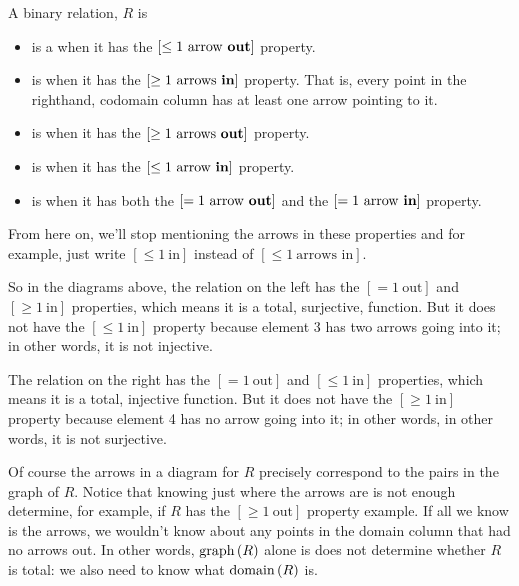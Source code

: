 \begin{definition}
A binary relation, $R$ is
\begin{itemize}

\item is a  when it has the $[\le 1\ \text{arrow
    \textbf{out}}]$ property.

\item is  when it has the $[\ge 1\ \text{arrows
    \textbf{in}}]$ property.  That is, every point in the righthand,
     codomain column has at least one arrow pointing to it.

\item is  when it has the $[\ge 1\ \text{arrows
       \textbf{out}}]$ property.

\item is  when it has the $[\le 1\ \text{arrow
    \textbf{in}}]$ property.

\item is  when it has both the $[=1\ \text{arrow
    \textbf{out}}]$ and the $[=1\ \text{arrow \textbf{in}}]$ property.
\end{itemize}
\end{definition}

From here on, we'll stop mentioning the arrows in these properties and for
example, just write $[\le 1\ \text{in}]$ instead of $[\le 1\ \text{arrows
  in}]$.

So in the diagrams above, the relation on the left has the $[=1\
\text{out}]$ and $[\ge 1\ \text{in}]$ properties, which means it is a
total, surjective, function.  But it does not have the $[\le 1\
\text{in}]$ property because element 3 has two arrows going into it; in
other words, it is not injective.

The relation on the right has the $[=1\ \text{out}]$ and $[\le 1\
\text{in}]$ properties, which means it is a total, injective
function.  But it does not have the $[\ge 1\ \text{in}]$ property
because element 4 has no arrow going into it; in other words, in other
words, it is not surjective.

Of course the arrows in a diagram for $R$ precisely correspond to the
pairs in the graph of $R$.  Notice that knowing just where the arrows are
is not enough determine, for example, if $R$ has the $[\ge 1\ \text{out}]$
property example.  If all we know is the arrows, we wouldn't know about
any points in the domain column that had no arrows out.  In other words,
$\mathop{\textup{graph}}\nolimits\left(R\right)$ alone is does not determine whether $R$ is total: we also need
to know what $\mathop{\textup{domain}}\nolimits\left(R\right)$ is.

